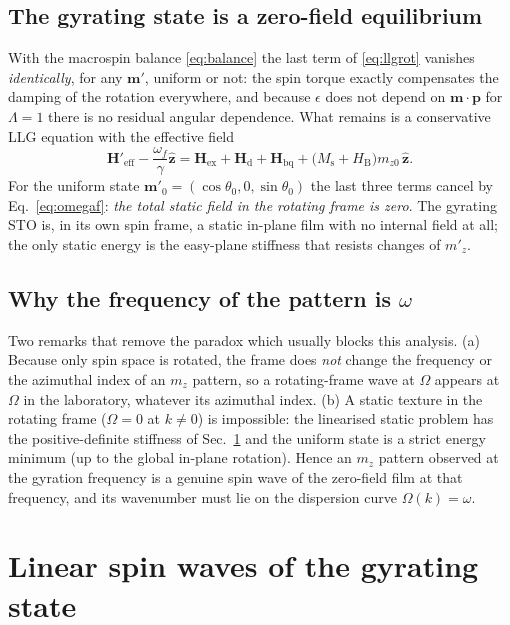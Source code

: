 \documentclass[11pt,a4paper]{article}
\newcommand{\vect}[1]{\mathbf{#1}}
\newcommand{\uv}[1]{\hat{\mathbf{#1}}}
\newcommand{\Ms}{M_\mathrm{s}}
\newcommand{\HB}{H_\mathrm{B}}
\begin{document}
\subsection{The gyrating state is a zero-field equilibrium}
With the macrospin balance \eqref{eq:balance} the last term of \eqref{eq:llgrot} vanishes \emph{identically},
for any $\vect m'$, uniform or not: the spin torque exactly compensates the damping of the rotation everywhere,
and because $\epsilon$ does not depend on $\vect m\cdot\vect p$ for $\Lambda=1$ there is no residual angular
dependence.  What remains is a conservative LLG equation with the effective field
\begin{equation}
\vect H'_\mathrm{eff}-\frac{\omega_f}{\gamma}\uv z
=\vect H_\mathrm{ex}+\vect H_\mathrm{d}+\vect H_\mathrm{bq}+\big(\Ms+\HB\big)m_{z0}\,\uv z .
\end{equation}
For the uniform state $\vect m'_0=(\cos\theta_0,0,\sin\theta_0)$ the last three terms cancel by
Eq.~\eqref{eq:omegaf}: \emph{the total static field in the rotating frame is zero}.  The gyrating STO is, in
its own spin frame, a static in-plane film with no internal field at all; the only static energy is the
easy-plane stiffness that resists changes of $m'_z$.

\subsection{Why the frequency of the pattern is $\omega$}
Two remarks that remove the paradox which usually blocks this analysis.  (a) Because only spin space is rotated,
the frame does \emph{not} change the frequency or the azimuthal index of an $m_z$ pattern, so a
rotating-frame wave at $\Omega$ appears at $\Omega$ in the laboratory, whatever its azimuthal index.  (b) A static
texture in the rotating frame ($\Omega=0$ at $k\neq0$) is impossible: the linearised static problem has the
positive-definite stiffness of Sec.~\ref{sec:disp} and the uniform state is a strict energy minimum (up to the
global in-plane rotation).  Hence an $m_z$ pattern observed at the gyration frequency is a genuine spin wave of
the zero-field film at that frequency, and its wavenumber must lie on the dispersion curve $\Omega(k)=\omega$.

\section{Linear spin waves of the gyrating state}
\label{sec:disp}
\end{document}
